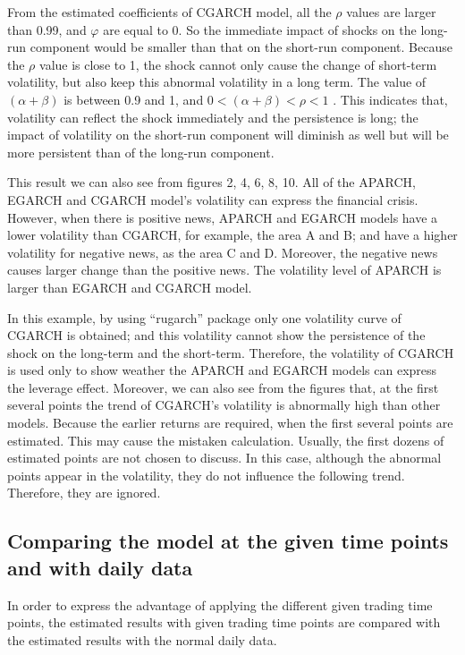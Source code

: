 From the estimated coefficients of CGARCH model, all the $\rho$  values are larger than 0.99, and $\varphi$  are equal to 0. So the immediate impact of shocks on the long-run component would be smaller than that on the short-run component. Because the $\rho$  value is close to 1, the shock cannot only cause the change of short-term volatility, but also keep this abnormal volatility in a long term. The value of $(\alpha + \beta)$  is between 0.9 and 1, and $0 < (\alpha + \beta) < \rho <1$ . This indicates that, volatility can reflect the shock immediately and the persistence is long; the impact of volatility on the short-run component will diminish as well but will be more persistent than of the long-run component.

This result we can also see from figures 2, 4, 6, 8, 10. All of the APARCH, EGARCH and CGARCH model’s volatility can express the financial crisis. However, when there is positive news, APARCH and EGARCH models have a lower volatility than CGARCH, for example, the area A and B; and have a higher volatility for negative news, as the area C and D. Moreover, the negative news causes larger change than the positive news. The volatility level of APARCH is larger than EGARCH and CGARCH model.

In this example, by using ``rugarch'' package only one volatility curve of CGARCH is obtained; and this volatility cannot show the persistence of the shock on the long-term and the short-term. Therefore, the volatility of CGARCH is used only to show weather the APARCH and EGARCH models can express the leverage effect. Moreover, we can also see from the figures that, at the first several points the trend of CGARCH’s volatility is abnormally high than other models. Because the earlier returns are required, when the first several points are estimated. This may cause the mistaken calculation. Usually, the first dozens of estimated points are not chosen to discuss. In this case, although the abnormal points appear in the volatility, they do not influence the following trend. Therefore, they are ignored.

\subsection{Comparing the model at the given time points and with daily data}

In order to express the advantage of applying the different given trading time points, the estimated results with given trading time points are compared with the estimated results with the normal daily data.

